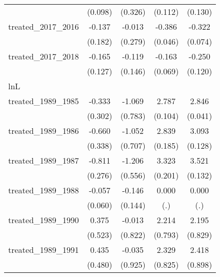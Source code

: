 {\begin{tabular}{l*{4}{c}}
            &     (0.098)         &     (0.326)         &     (0.112)         &     (0.130)         \\
[1em]
treated\_2017\_2016&      -0.137         &      -0.013         &      -0.386\sym{***}&      -0.322\sym{***}\\
            &     (0.182)         &     (0.279)         &     (0.046)         &     (0.074)         \\
[1em]
treated\_2017\_2018&      -0.165         &      -0.119         &      -0.163\sym{*}  &      -0.250\sym{*}  \\
            &     (0.127)         &     (0.146)         &     (0.069)         &     (0.120)         \\
\hline
lnL         &                     &                     &                     &                     \\
treated\_1989\_1985&      -0.333         &      -1.069         &       2.787\sym{***}&       2.846\sym{***}\\
            &     (0.302)         &     (0.783)         &     (0.104)         &     (0.041)         \\
[1em]
treated\_1989\_1986&      -0.660         &      -1.052         &       2.839\sym{***}&       3.093\sym{***}\\
            &     (0.338)         &     (0.707)         &     (0.185)         &     (0.128)         \\
[1em]
treated\_1989\_1987&      -0.811\sym{**} &      -1.206\sym{*}  &       3.323\sym{***}&       3.521\sym{***}\\
            &     (0.276)         &     (0.556)         &     (0.201)         &     (0.132)         \\
[1em]
treated\_1989\_1988&      -0.057         &      -0.146         &       0.000         &       0.000         \\
            &     (0.060)         &     (0.144)         &         (.)         &         (.)         \\
[1em]
treated\_1989\_1990&       0.375         &      -0.013         &       2.214\sym{**} &       2.195\sym{**} \\
            &     (0.523)         &     (0.822)         &     (0.793)         &     (0.829)         \\
[1em]
treated\_1989\_1991&       0.435         &      -0.035         &       2.329\sym{**} &       2.418\sym{**} \\
            &     (0.480)         &     (0.925)         &     (0.825)         &     (0.898)         \\

\end{tabular}}
